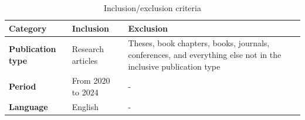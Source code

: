 \begin{table}[htbp]
	\centering
	\caption{Inclusion/exclusion criteria}
	\label{table:inclusion_exclusion_criteria}
	\renewcommand{\arraystretch}{1}  %
	\begin{tabular}{p{1.5cm}p{2.2cm}p{3.9cm}}
		\toprule
		\textbf{Category}           & \textbf{Inclusion}         & \textbf{Exclusion}                                                                                                          \\
		\midrule
		\textbf{Publication type} & Research articles & Theses, book chapters, books, journals, conferences, and everything else not in the inclusive publication type \\
		\addlinespace[0.8em]
		\textbf{Period}             & From 2020 to 2024      & -                                                                                                                           \\
		\addlinespace[0.8em]
		\textbf{Language}              & English                     & -                                                                                                                           \\
		\bottomrule
	\end{tabular}
\end{table}

